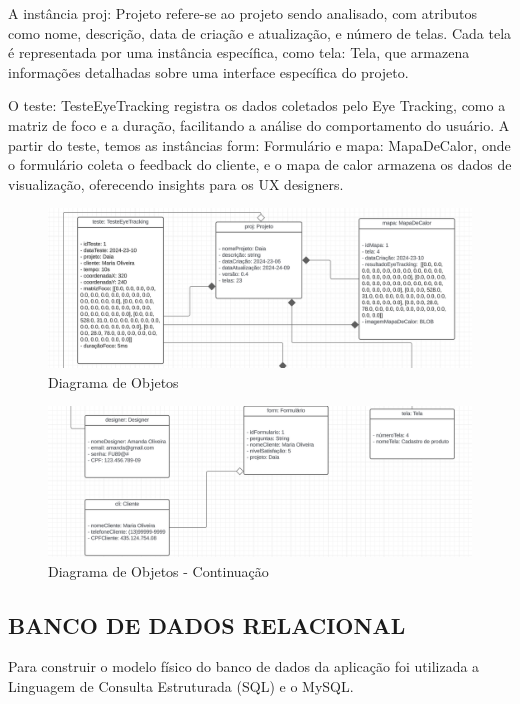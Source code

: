 A instância proj: Projeto refere-se ao projeto sendo analisado, com atributos como nome, descrição, data de criação e atualização, e número de telas. Cada tela é representada por uma instância específica, como tela: Tela, que armazena informações detalhadas sobre uma interface específica do projeto.

O teste: TesteEyeTracking registra os dados coletados pelo Eye Tracking, como a matriz de foco e a duração, facilitando a análise do comportamento do usuário. A partir do teste, temos as instâncias form: Formulário e mapa: MapaDeCalor, onde o formulário coleta o feedback do cliente, e o mapa de calor armazena os dados de visualização, oferecendo insights para os UX designers.\newline

\begin{figure}[H]
    \centering
    \caption{Diagrama de Objetos}%
    \label{fig:pg-objetos}
    \includegraphics[width=0.72\linewidth]{Illustrations/objetos1.png}
\end{figure}

\vspace{12pt}

\begin{figure}[H]
    \centering
    \caption{Diagrama de Objetos - Continuação}%
    \label{fig:pg-objetos2}
    \includegraphics[width=0.72\linewidth]{Illustrations/objetos2.png}
\end{figure}

\subsection*{BANCO DE DADOS RELACIONAL}
Para construir o modelo físico do banco de dados da aplicação foi utilizada a Linguagem de Consulta Estruturada (SQL) e o MySQL.

